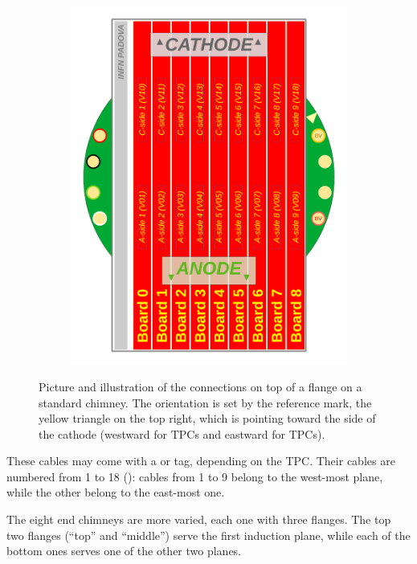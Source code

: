 \begin{figure}
\begin{subfigure}{0.55\linewidth}
    \includegraphics[width=\textwidth]{figures/TopFlangesAndMinicrate}
    \label{fig:FlangeConnectionsStandard}
  \end{subfigure}
  \caption{
    Picture and illustration of the connections on top of a flange on a standard chimney.
    The orientation is set by the reference mark,
    the yellow triangle on the top right,
    which is pointing toward the side of the cathode
    (\ie westward for  TPCs and eastward for  TPCs).
  }
\end{figure}

These cables may come with a  or  tag, depending on the TPC.
Their cables are numbered from 1 to 18 (\eg {}):
cables from 1 to 9 belong to the west-most plane, while the other belong to the east-most one.

The eight end chimneys are more varied, each one with three flanges.
The top two flanges (``top'' and ``middle'') serve the first induction plane,
while each of the bottom ones serves one of the other two planes.

